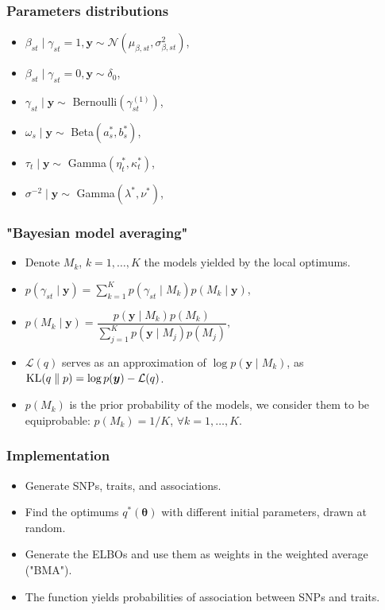 \documentclass{beamer}
\DeclareMathOperator*{\KL}{{\rm KL}}
\begin{document}
\begin{frame}
\frametitle{Parameters distributions}
\begin{itemize}
\item $\beta_{st} \mid \gamma_{st} = 1, \boldsymbol{y} \sim \mathcal{N}\left(\mu_{\beta,st},\sigma_{\beta,st}^2\right)$,
\item $\beta_{st} \mid \gamma_{st} = 0, \boldsymbol{y} \sim \delta_0$,
\item $\gamma_{st} \mid \boldsymbol{y} \sim $ Bernoulli$(\gamma_{st}^{(1)})$,
\item $\omega_s \mid \boldsymbol{y} \sim $ Beta$(a^*_s, b^*_s)$,
\item $\tau_t \mid \boldsymbol{y} \sim $ Gamma$(\eta_t^*, \kappa_t^*)$,
\item $\sigma^{-2} \mid \boldsymbol{y} \sim $ Gamma$(\lambda^*,\nu^*)$,
\end{itemize}
\end{frame}

\begin{frame}
\frametitle{"Bayesian model averaging"}
\begin{itemize}
\item Denote $M_k$, $k= 1,\ldots, K$ the models yielded by the local optimums.
\item $p(\gamma_{st} \mid \boldsymbol{y}) = \sum_{k=1}^{K}p(\gamma_{st}\mid M_k)p(M_k \mid \boldsymbol{y})$,
\item $p(M_k \mid \boldsymbol{y}) = \dfrac{p(\boldsymbol{y} \mid M_k)p(M_k)}{\sum_{j=1}^{K}p(\boldsymbol{y}\mid M_j)p(M_j)},$
\item $\mathcal{L}(q)$ serves as an approximation of $\log p(\boldsymbol{y} \mid M_k)$, as $\KL(q\parallel p) = \log p(\boldsymbol{y}) - \mathcal{L}(q)$.
\item $p(M_k)$ is the prior probability of the models, we consider them to be equiprobable: $p(M_k) = 1/K$, $\forall k = 1,\ldots,K$.
\end{itemize}
\end{frame}

\begin{frame}
\frametitle{Implementation}
\begin{itemize}
\item Generate SNPs, traits, and associations.
\item Find the optimums $q^*(\boldsymbol{\theta})$ with different initial parameters, drawn at random.
\item Generate the ELBOs and use them as weights in the weighted average ("BMA").
\item The function yields probabilities of association between SNPs and traits.
\end{itemize}
\end{frame}
\end{document}
